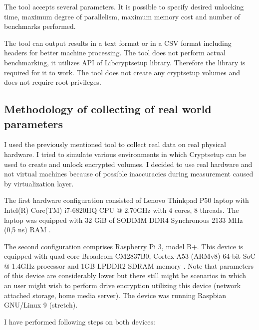 \documentclass[nolof]{fithesis3}
\begin{document}
The tool accepts several parameters. It is possible to specify desired unlocking time, maximum degree of parallelism, maximum memory cost and number of benchmarks performed.

The tool can output results in a text format or in a CSV format including headers for better machine processing. The tool does not perform actual benchmarking, it utilizes API of Libcryptsetup library. Therefore the library is required for it to work. The tool does not create any cryptsetup volumes and does not require root privileges.

\subsection{Methodology of collecting of real world parameters}
\label{subsec:laptop}
I used the previously mentioned tool to collect real data on real physical hardware. I tried to simulate various environments in which Cryptsetup can be used to create and unlock encrypted volumes. I decided to use real hardware and not virtual machines because of possible inaccuracies during measurement caused by virtualization layer.

The first hardware configuration consisted of Lenovo Thinkpad P50 laptop with Intel(R) Core(TM) i7-6820HQ CPU @ 2.70GHz with 4 cores, 8 threads. The laptop was equipped with 32 GiB of SODIMM DDR4 Synchronous 2133 MHz (0,5 ns) RAM \parencite{laptopspecs}.

The second configuration comprises Raspberry Pi 3, model B+. This device is equipped with quad core Broadcom CM2837B0, Cortex-A53 (ARMv8) 64-bit SoC @ 1.4GHz processor and 1GB LPDDR2 SDRAM memory \parencite{raspberryspecs}. Note that parameters of this device are considerably lower but there still might be scenarios in which an user might wish to perform drive encryption utilizing this device (network attached storage, home media server). The device was running Raspbian GNU/Linux 9 (stretch).

I have performed following steps on both devices:
\end{document}
